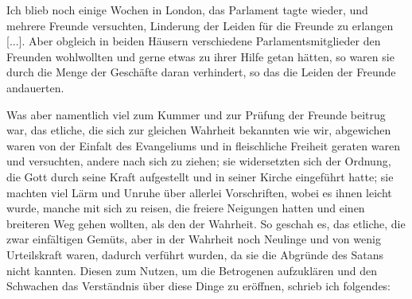 Ich blieb noch einige Wochen in London, das Parlament tagte
wieder, und mehrere Freunde versuchten, Linderung der Leiden für
die Freunde zu erlangen [...]. Aber obgleich in beiden Häusern
verschiedene Parlamentsmitglieder den Freunden wohlwollten und
gerne etwas zu ihrer Hilfe getan hätten, so waren sie durch die
Menge der Geschäfte daran verhindert, so das die Leiden der
Freunde andauerten.

Was aber namentlich viel zum Kummer und zur Prüfung
der Freunde beitrug war, das etliche, die sich zur gleichen 
Wahrheit bekannten wie wir, abgewichen waren von der Einfalt des
Evangeliums und in fleischliche Freiheit geraten waren und 
versuchten, andere nach sich zu ziehen; sie widersetzten sich der
Ordnung, die Gott durch seine Kraft aufgestellt und in seiner
Kirche eingeführt hatte; sie machten viel Lärm und Unruhe über
allerlei Vorschriften, wobei es ihnen leicht wurde, manche mit
sich zu reisen, die freiere Neigungen hatten und einen breiteren
Weg gehen wollten, als den der Wahrheit. So geschah es,
das etliche, die zwar einfältigen Gemüts, aber in der Wahrheit
noch Neulinge und von wenig Urteilskraft waren, dadurch 
verführt wurden, da sie die Abgründe des Satans nicht kannten.
Diesen zum Nutzen, um die Betrogenen aufzuklären und den
Schwachen das Verständnis über diese Dinge zu eröffnen, schrieb
ich folgendes: 

